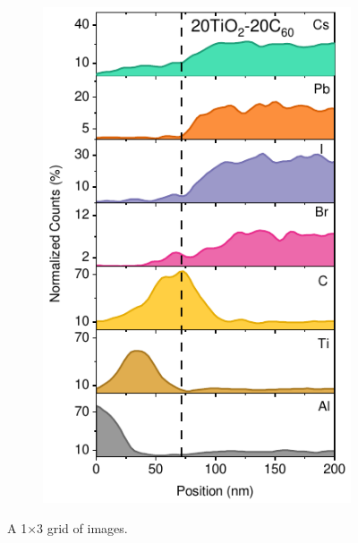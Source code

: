 \begin{figure}[htbp]
\begin{subfigure}{0.32\textwidth}
        \includegraphics[width=\textwidth]{chapters/transport_layers/images/TEM_20_20.pdf}
        \caption{}
        \label{}
    \end{subfigure}
    
    \caption{A 1×3 grid of images.}
    \label{fig:etl_opt:eds_concentration}
\end{figure}

